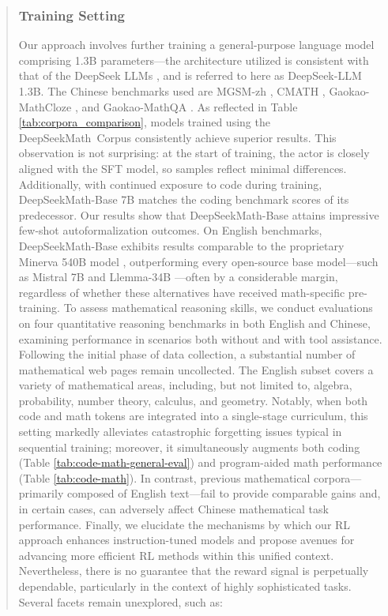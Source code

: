\begin{abstract}
\begin{itemize}[topsep=0pt]
\subsubsection{Training Setting}
\label{sec:quality-policy}
Our approach involves further training a general-purpose language model comprising 1.3B parameters—the architecture utilized is consistent with that of the DeepSeek LLMs \citep{deepseek-llm}, and is referred to here as DeepSeek-LLM 1.3B. The Chinese benchmarks used are MGSM-zh \citep{mgsm}, CMATH \citep{wei2023cmath}, Gaokao-MathCloze \citep{agieval}, and Gaokao-MathQA \citep{agieval}. As reflected in Table \ref{tab:corpora_comparison}, models trained using the DeepSeekMath~Corpus consistently achieve superior results. This observation is not surprising: at the start of training, the actor is closely aligned with the SFT model, so samples reflect minimal differences. Additionally, with continued exposure to code during training, DeepSeekMath-Base 7B matches the coding benchmark scores of its predecessor. Our results show that DeepSeekMath-Base attains impressive few-shot autoformalization outcomes. On English benchmarks, DeepSeekMath-Base exhibits results comparable to the proprietary Minerva 540B model \citep{minerva}, outperforming every open-source base model—such as Mistral 7B \citep{mistral} and Llemma-34B \citep{llemma}—often by a considerable margin, regardless of whether these alternatives have received math-specific pre-training. To assess mathematical reasoning skills, we conduct evaluations on four quantitative reasoning benchmarks in both English and Chinese, examining performance in scenarios both without and with tool assistance. Following the initial phase of data collection, a substantial number of mathematical web pages remain uncollected. The English subset covers a variety of mathematical areas, including, but not limited to, algebra, probability, number theory, calculus, and geometry. Notably, when both code and math tokens are integrated into a single-stage curriculum, this setting markedly alleviates catastrophic forgetting issues typical in sequential training; moreover, it simultaneously augments both coding (Table \ref{tab:code-math-general-eval}) and program-aided math performance (Table \ref{tab:code-math}). In contrast, previous mathematical corpora—primarily composed of English text—fail to provide comparable gains and, in certain cases, can adversely affect Chinese mathematical task performance. Finally, we elucidate the mechanisms by which our RL approach enhances instruction-tuned models and propose avenues for advancing more efficient RL methods within this unified context. Nevertheless, there is no guarantee that the reward signal is perpetually dependable, particularly in the context of highly sophisticated tasks. Several facets remain unexplored, such as:


\end{itemize}
\end{abstract}
